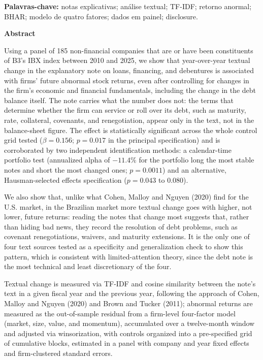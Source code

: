 \documentclass[a4paper,12pt]{report}
\renewenvironment{abstract}{
    \begin{center}
        \textbf{\abstractname}
    \end{center}
}{}
\begin{document}
\vspace{0.5cm}
\noindent
\textbf{Palavras-chave:} notas explicativas; análise textual; TF-IDF; retorno anormal; BHAR; modelo de quatro fatores; dados em painel; disclosure.
\thispagestyle{empty}
\newpage

\renewcommand{\abstractname}{Abstract}
\begin{abstract}
    Using a panel of 185 non-financial companies that are or have been constituents of B3's IBX index between 2010 and 2025, we show that year-over-year textual change in the explanatory note on loans, financing, and debentures is associated with firms' future abnormal stock returns, even after controlling for changes in the firm's economic and financial fundamentals, including the change in the debt balance itself. The note carries what the number does not: the terms that determine whether the firm can service or roll over its debt, such as maturity, rate, collateral, covenants, and renegotiation, appear only in the text, not in the balance-sheet figure. The effect is statistically significant across the whole control grid tested ($\beta=0.156$; $p=0.017$ in the principal specification) and is corroborated by two independent identification methods: a calendar-time portfolio test (annualized alpha of $-11.4\%$ for the portfolio long the most stable notes and short the most changed ones; $p=0.0011$) and an alternative, Hausman-selected effects specification ($p=0.043$ to $0.080$).

    \noindent We also show that, unlike what Cohen, Malloy and Nguyen (2020) find for the U.S. market, in the Brazilian market more textual change goes with higher, not lower, future returns: reading the notes that change most suggests that, rather than hiding bad news, they record the resolution of debt problems, such as covenant renegotiations, waivers, and maturity extensions. It is the only one of four text sources tested as a specificity and generalization check to show this pattern, which is consistent with limited-attention theory, since the debt note is the most technical and least discretionary of the four.

    \noindent Textual change is measured via TF-IDF and cosine similarity between the note's text in a given fiscal year and the previous year, following the approach of Cohen, Malloy and Nguyen (2020) and Brown and Tucker (2011); abnormal returns are measured as the out-of-sample residual from a firm-level four-factor model (market, size, value, and momentum), accumulated over a twelve-month window and adjusted via winsorization, with controls organized into a pre-specified grid of cumulative blocks, estimated in a panel with company and year fixed effects and firm-clustered standard errors.
\end{abstract}
\end{document}
